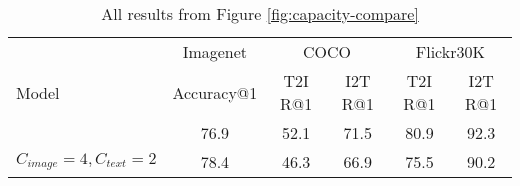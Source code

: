 \begin{table*}[h]
\caption{All results from Figure \ref{fig:capacity-compare}}
\label{tab:appendix-capacity-compare}
\vskip 0.15in
\begin{center}
\begin{small}
\begin{sc}
\begin{tabular}{lccccc}
\toprule
\multirow{3}{*}{Model} &\multicolumn{1}{c}{Imagenet} &\multicolumn{2}{c}{COCO} &\multicolumn{2}{c}{Flickr30K} \\
&Accuracy@1 &T2I R@1 &I2T R@1 &T2I R@1 &I2T R@1 \\

\midrule
$C_{image}=2, C_{text}=2$ & 76.9 &52.1 &71.5 &80.9 &92.3 \rule{0pt}{3ex} \\
$C_{image}=4, C_{text}=2$ &78.4 &46.3 &66.9 &75.5 &90.2 \rule{0pt}{3ex} \\
\bottomrule
\end{tabular}
\end{sc}
\end{small}
\end{center}
\end{table*}